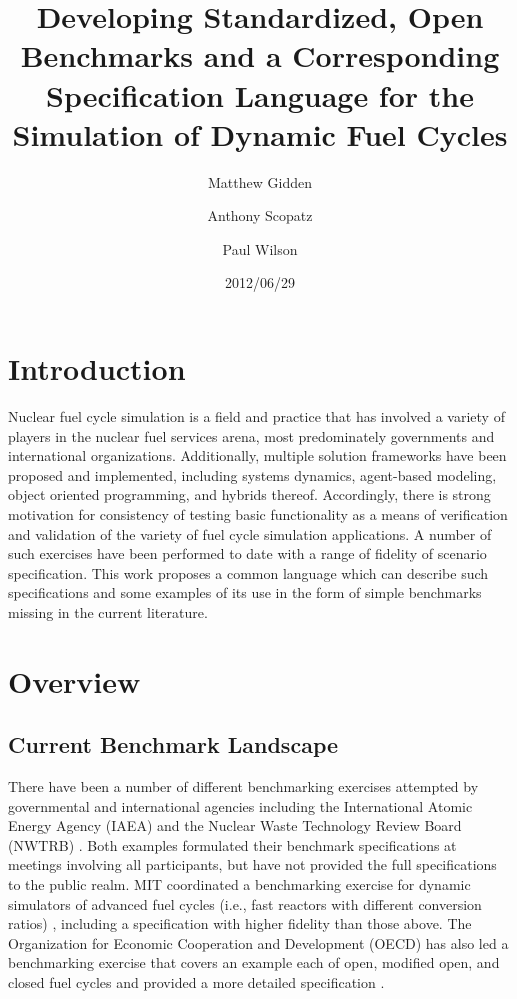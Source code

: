 \documentclass{anstrans}
\title{Developing Standardized, Open Benchmarks and a Corresponding 
Specification Language for the Simulation of Dynamic Fuel Cycles}
\author[*]{Matthew Gidden}
\author[$\dag$]{Anthony Scopatz}
\author[*]{Paul Wilson}
\affil[*]{Department of Nuclear Engineering \& Engineering Physics, 
University of Wisconsin - Madison, Madison, WI, 53703}
\affil[$\dag$]{The Flash Center for Computational Science, University 
of Chicago, Chicago, IL, 60637}
\date{2012/06/29}
\begin{document}
\section{Introduction}
Nuclear fuel cycle simulation is a field and practice that has involved a
variety of players in the nuclear fuel services arena, most predominately
governments and international organizations.  Additionally, multiple solution
frameworks have been proposed and implemented, including systems dynamics,
agent-based modeling, object oriented programming, and hybrids
thereof. Accordingly, there is strong motivation for consistency of testing
basic functionality as a means of verification and validation of the variety of
fuel cycle simulation applications. A number of such exercises have been
performed to date with a range of fidelity of scenario specification. This work
proposes a common language which can describe such specifications and
some examples of its use in the form of simple benchmarks missing in the 
current literature.

\section{Overview}

\subsection{Current Benchmark Landscape}
There have been a number of different benchmarking exercises attempted by
governmental and international agencies including the International Atomic
Energy Agency (IAEA) \cite{_international_2011} and the Nuclear Waste Technology
Review Board (NWTRB) \cite{_nuclear_2011}.  Both examples formulated their
benchmark specifications at meetings involving all participants, but have not
provided the full specifications to the public realm. MIT coordinated a
benchmarking exercise for dynamic simulators of advanced fuel cycles (i.e., fast
reactors with different conversion ratios) \cite{guerin_benchmark_2009},
including a specification with higher fidelity than those above. The
Organization for Economic Cooperation and Development (OECD) has also led a
benchmarking exercise that covers an example each of open, modified open, and
closed fuel cycles \cite{boucher_benchmark_2012} and provided a more detailed
specification \cite{boucher_specification_2008}.
\end{document}

